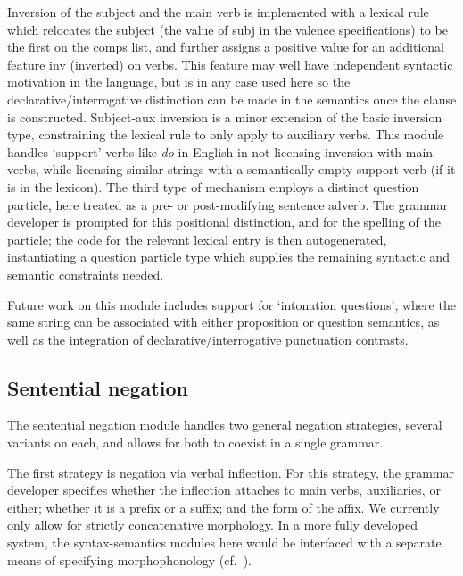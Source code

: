 \documentclass[11pt]{article}
\begin{document}

Inversion of the subject and the main verb is implemented with a
lexical rule which relocates the subject (the value of {\sc subj} in
the valence specifications) to be the first on the {\sc comps} list,
and further assigns a positive value for an additional feature {\sc
inv} (inverted) on verbs.  This feature may well have independent
syntactic motivation in the language, but is in any case used here so
the declarative/interrogative distinction can be made in the semantics
once the clause is constructed.
Subject-aux inversion is a minor extension of the basic inversion
type, constraining the lexical rule to only apply to auxiliary
verbs.  This module handles `support' verbs like {\it do} in English
in not licensing inversion with main verbs, while
licensing similar strings with a semantically empty support verb
(if it is in the lexicon).  
The third type of mechanism employs a distinct question particle, here
treated as a pre- or post-modifying sentence adverb.  The grammar developer is
prompted for this positional distinction, and for the spelling of the
particle; the code for the relevant lexical entry is then
autogenerated, instantiating a question particle type which supplies
the remaining syntactic and semantic constraints needed.

Future work on this module includes support for `intonation questions',
where the same string can be associated with either proposition or question
semantics, as well as the integration of declarative/interrogative punctuation
contrasts.

\subsection{Sentential negation}

The sentential negation module handles two general negation strategies,
several variants on each, and allows for both to coexist in a single grammar.

The first strategy is negation via verbal inflection.  For this
strategy, the grammar developer specifies whether the inflection
attaches to main verbs, auxiliaries, or either; whether it is a prefix
or a suffix; and the form of the affix.  We currently only allow for
strictly concatenative morphology.  In a more fully developed system,
the syntax-semantics modules here would be interfaced with a separate
means of specifying morphophonology (cf.\ \cite{Ben:Goo:05}).
\end{document}
